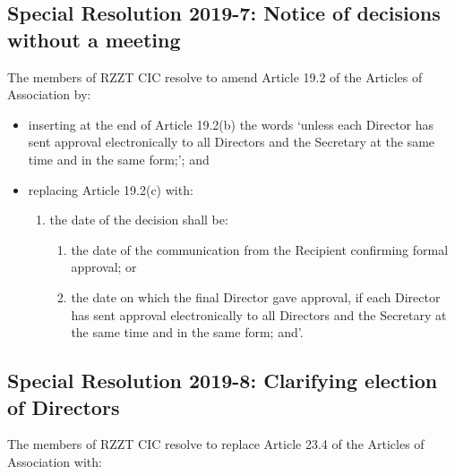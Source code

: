 \documentclass[a4paper,10pt]{article}
\begin{document}
\subsection{Special Resolution 2019-7: Notice of decisions without a meeting}

The members of RZZT CIC resolve to amend Article 19.2 of the Articles of Association by:

\begin{itemize}
  \item inserting at the end of Article 19.2(b) the words `unless each Director has sent approval electronically to all Directors and the Secretary at the same time and in the same form;'; and
  \item replacing Article 19.2(c) with:
  \begin{framed}
    \begin{enumerate}
      \renewcommand{\labelenumi}{(\alph{enumi})}
      \setcounter{enumi}{2}
      \item the date of the decision shall be:
      \begin{enumerate}
        \renewcommand{\labelenumii}{(\roman{enumii})}
        \item the date of the communication from the Recipient confirming formal approval; or
        \item the date on which the final Director gave approval, if each Director has sent approval electronically to all Directors and the Secretary at the same time and in the same form; and'.
      \end{enumerate}
    \end{enumerate}
  \end{framed}
\end{itemize}

\subsection{Special Resolution 2019-8: Clarifying election of Directors}

The members of RZZT CIC resolve to replace Article 23.4 of the Articles of Association with:
\end{document}
